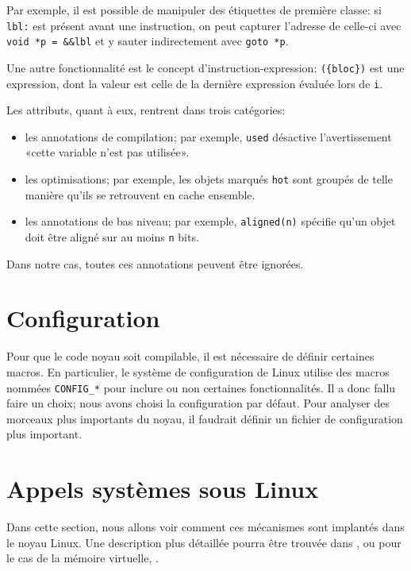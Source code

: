Par exemple, il est possible de manipuler des étiquettes de première classe: si
\texttt{lbl:} est présent avant une instruction, on peut capturer l'adresse de
celle-ci avec \texttt{void *p = \&\&lbl} et y sauter indirectement avec
\texttt{goto *p}.

Une autre fonctionnalité est le concept d'instruction-expression:
\texttt{(\{bloc\})} est une expression, dont la valeur est celle de la dernière
expression évaluée lors de \texttt{i}.

Les attributs, quant à eux, rentrent dans trois catégories:

\begin{itemize}
  \item les annotations de compilation; par exemple, \texttt{used} désactive
    l'avertissement «cette variable n'est pas utilisée».

  \item les optimisations; par exemple, les objets marqués \texttt{hot} sont
    groupés de telle manière qu'ils se retrouvent en cache ensemble.

  \item les annotations de bas niveau; par exemple, \verb!aligned(n)!
    spécifie qu'un objet doit être aligné sur au moins \texttt{n} bits.
\end{itemize}

Dans notre cas, toutes ces annotations peuvent être ignorées.

\section{Configuration}

Pour que le code noyau soit compilable, il est nécessaire de définir certaines
macros. En particulier, le système de configuration de Linux utilise des macros
nommées \texttt{CONFIG\_*} pour inclure ou non certaines fonctionnalités. Il a
donc fallu faire un choix; nous avons choisi la configuration par défaut. Pour
analyser des morceaux plus importants du noyau, il faudrait définir un fichier
de configuration plus important.

\section{Appels systèmes sous Linux}
\label{sec:linux-sys}

Dans cette section, nous allons voir comment ces mécanismes sont implantés dans
le noyau Linux. Une description plus détaillée pourra être trouvée dans
\cite{UnderstandingTheLinuxKernel}, ou pour le cas de la mémoire virtuelle,
\cite{LinuxVMM}.

